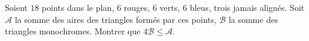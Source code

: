 Soient $18$ points dans le plan, $6$ rouges, $6$ verts, $6$ bleus, trois jamais alignés. Soit $\mathcal{A}$ la somme des aires des triangles formés par ces points, $\mathcal{B}$ la somme des triangles monochromes. Montrer que $4\mathcal{B} \leq \mathcal{A}$.
